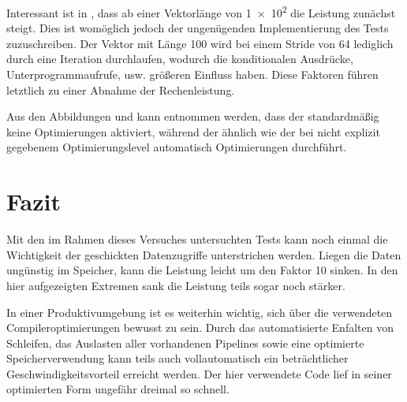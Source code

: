 Interessant ist in , dass ab einer Vektorlänge von \num{1e2} die
Leistung zunächst steigt. Dies ist womöglich jedoch der ungenügenden Implementierung
des Tests zuzuschreiben. Der Vektor mit Länge 100 wird bei einem Stride von 64
lediglich durch eine Iteration durchlaufen, wodurch die konditionalen Ausdrücke,
Unterprogrammaufrufe, usw. größeren Einfluss haben. Diese Faktoren führen letztlich
zu einer Abnahme der Rechenleistung.

Aus den Abbildungen  und  kann entnommen werden,
dass der \gcc standardmäßig keine Optimierungen aktiviert, während der \icc ähnlich
wie der \pgcc bei nicht explizit gegebenem Optimierungslevel automatisch Optimierungen
durchführt.

\section{Fazit}

Mit den im Rahmen dieses Versuches untersuchten Tests kann noch einmal die
Wichtigkeit der geschickten Datenzugriffe unterstrichen werden. Liegen die Daten
ungünstig im Speicher, kann die Leistung leicht um den Faktor 10 sinken.
In den hier aufgezeigten Extremen sank die Leistung teils sogar noch stärker.

In einer Produktivumgebung ist es weiterhin wichtig, sich über die verwendeten
Compileroptimierungen bewusst zu sein. Durch das automatisierte Enfalten von
Schleifen, das Auslasten aller vorhandenen Pipelines sowie eine optimierte
Speicherverwendung kann teils auch vollautomatisch ein beträchtlicher Geschwindigkeitsvorteil
erreicht werden. Der hier verwendete Code lief in seiner optimierten Form ungefähr
dreimal so schnell.
